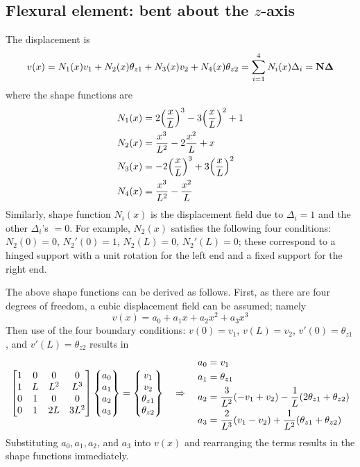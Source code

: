 \subsection{Flexural element: bent about the \texorpdfstring{$z$}{z}-axis}
The displacement is
\begin{equation}
  v(x) = N_1(x)v_1 + N_2(x)\theta_{z1} + N_3(x)v_2 + N_4(x)\theta_{z2} = \sum_{i=1}^4 N_i(x)\Delta_i = \mathbf{N}\bm{\Delta}
\end{equation}
where the shape functions are
\begin{align*}
  N_1(x) &= 2\Bigl(\frac xL\Bigr)^3 - 3\Bigl(\frac xL\Bigr)^2 + 1\\
  N_2(x) &= \frac{x^3}{L^2} - 2\frac{x^2}{L} + x\\
  N_3(x) &= -2\Bigl(\frac xL\Bigr)^3 + 3\Bigl(\frac xL\Bigr)^2\\
  N_4(x) &= \frac{x^3}{L^2} - \frac{x^2}{L}
\end{align*}
Similarly, shape function $N_i(x)$ is the displacement field due to $\Delta_i = 1$ and the other $\Delta_i$'s $= 0$. For example, $N_2(x)$ satisfies the following four conditions: $N_2(0) = 0$, $N_2'(0) = 1$, $N_2(L) = 0$, $N_2'(L) = 0$; these correspond to a hinged support with a unit rotation for the left end and a fixed support for the right end.

The above shape functions can be derived as follows. First, as there are four degrees of freedom, a cubic displacement field can be assumed; namely
\begin{equation}
  v(x) = a_0 + a_1x + a_2x^2 + a_3x^3
\end{equation}
Then use of the four boundary conditions: $v(0) = v_1$, $v(L) = v_2$, $v'(0) = \theta_{z1}$, and $v'(L) = \theta_{z2}$ results in
\begin{equation}
  \begin{bmatrix}1 & 0 & 0 & 0\\ 1 & L & L^2 & L^3\\ 0 & 1 & 0 & 0\\ 0 & 1 & 2L & 3L^2\end{bmatrix}\begin{Bmatrix}a_0\\ a_1\\ a_2\\ a_3\end{Bmatrix} = \begin{Bmatrix}v_1\\ v_2\\ \theta_{z1}\\ \theta_{z2}\end{Bmatrix}
  \quad\Rightarrow\quad
  \begin{aligned}
    a_0 &= v_1\\ a_1 &= \theta_{z1}\\ a_2 &= \frac{3}{L^2}(-v_1+v_2) - \frac1L(2\theta_{z1}+\theta_{z2})\\ a_3 &= \frac{2}{L^3}(v_1-v_2) + \frac{1}{L^2}(\theta_{z1}+\theta_{z2})
  \end{aligned}
\end{equation}
Substituting $a_0, a_1, a_2$, and $a_3$ into $v(x)$ and rearranging the terms results in the shape functions immediately.

